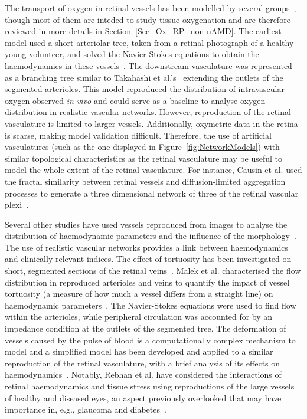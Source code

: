 \documentclass{article}
\begin{document}
The transport of oxygen in retinal vessels has been modelled by several groups~\cite{Causin_2015,Fry_et_al_2018,Liu_2009}, though most of them are inteded to study tissue oxygenation and are therefore reviewed in more details in Section~\ref{Sec_Ox_RP_non-nAMD}.
The earliest model used a short arteriolar tree, taken from a retinal photograph of a healthy young volunteer, and solved the Navier-Stokes equations to obtain the haemodynamics in these vessels~\cite{Liu_2009}.
The downstream vasculature was represented as a branching tree similar to Takahashi et al.'s~\cite{Takahashi_2009} extending the outlets of the segmented arterioles.
This model reproduced the distribution of intravascular oxygen observed \textit{in vivo} and could serve as a baseline to analyse oxygen distribution in realistic vascular networks.
However, reproduction of the retinal vasculature is limited to larger vessels.
Additionally, oxymetric data in the retina is scarse, making model validation difficult.
Therefore, the use of artificial vasculatures (such as the one displayed in Figure~\ref{fig:NetworkModels}) with similar topological characteristics as the retinal vasculature may be useful to model the whole extent of the retinal vasculature.
For instance, Causin et al. used the fractal similarity between retinal vessels and diffusion-limited aggregation processes to generate a three dimensional network of three of the retinal vascular plexi~\cite{Causin_2015}.

Several other studies have used vessels reproduced from images to analyse the distribution of haemodynamic parameters and the influence of the morphology~\cite{Ganesan_2010,Malek_2014,Malek_2015,Rebhan_2019}.
The use of realistic vascular networks provides a link between haemodynamics and clinically relevant indices.
The effect of tortuosity has been investigated on short, segmented sections of the retinal veins~\cite{Malek_2014}.
Malek et al. characterised the flow distribution in reproduced arterioles and veins to quantify the impact of vessel tortuosity (a measure of how much a vessel differs from a straight line) on haemodynamic parameters~\cite{Malek_2014,Malek_2015}.
The Navier-Stokes equations were used to find flow within the arterioles, while peripheral circulation was accounted for by an impedance condition at the outlets of the segmented tree.
The deformation of vessels caused by the pulse of blood is a computationally complex mechanism to model and a simplified model has been developed and applied to a similar reproduction of the retinal vasculature, with a brief analysis of its effects on haemodynamics~\cite{Aletti_2016}.
Notably, Rebhan et al. have considered the interactions of retinal haemodynamics and tissue stress using reproductions of the large vessels of healthy and diseased eyes, an aspect previously overlooked that may have importance in, e.g., glaucoma and diabetes~\cite{Rebhan_2019}.
\end{document}
